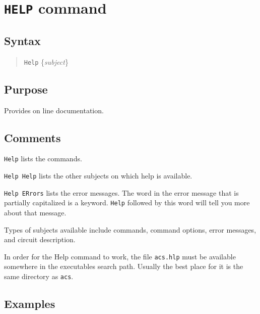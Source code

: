 \section{{\tt HELP} command}
\subsection{Syntax}
\begin{verse}
{\tt Help} \{{\it subject}\}
\end{verse}
\subsection{Purpose}

Provides on line documentation.
\subsection{Comments}

{\tt Help} lists the commands.

{\tt Help Help} lists the other subjects on which help is available.

{\tt Help ERrors} lists the error messages.  The word in the error message
that is partially capitalized is a keyword.  {\tt Help} followed by this
word will tell you more about that message.

Types of subjects available include commands, command options, error
messages, and circuit description.

In order for the Help command to work, the file {\tt acs.hlp} must be
available somewhere in the executables search path.  Usually the best
place for it is the same directory as {\tt acs}.
\subsection{Examples}

